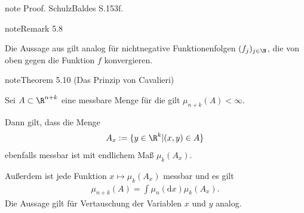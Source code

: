 \documentclass[letterpaper,10pt,english]{jupyterBook}
\begin{document}
\begin{sphinxadmonition}{note}
\sphinxAtStartPar
Proof. Schulz\sphinxhyphen{}Baldes S.153f.
\end{sphinxadmonition}
\label{masstheorie/integrationstechnik:remark-1}
\begin{sphinxadmonition}{note}{Remark 5.8}



\sphinxAtStartPar
Die Aussage aus  gilt analog für nichtnegative Funktionenfolgen \((f_j)_{j\in\N}\), die von oben gegen die Funktion \(f\) konvergieren.
\end{sphinxadmonition}
\label{masstheorie/integrationstechnik:theorem-2}
\begin{sphinxadmonition}{note}{Theorem 5.10 (Das Prinzip von Cavalieri)}



\sphinxAtStartPar
Sei \(A \subset \R^{n+k}\) eine messbare Menge für die gilt \(\mu_{n+k}(A) < \infty\).

\sphinxAtStartPar
Dann gilt, dass die Menge
\begin{equation*}
\begin{split}A_x := \lbrace y \in \R^k | (x,y) \in A \rbrace\end{split}
\end{equation*}
\sphinxAtStartPar
ebenfalls messbar ist mit endlichem Maß \(\mu_k(A_x)\).

\sphinxAtStartPar
Außerdem ist jede Funktion \(x \mapsto \mu_k(A_x)\) messbar und es gilt
\begin{equation*}
\begin{split}\mu_{n+k}(A) = \int \mu_n(\mathrm{d}x) \mu_k(A_x).\end{split}
\end{equation*}
\sphinxAtStartPar
Die Aussage gilt für Vertauschung der Variablen \(x\) und \(y\) analog.
\end{sphinxadmonition}
\end{document}
